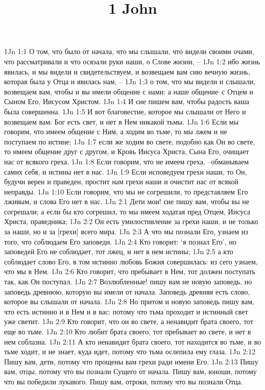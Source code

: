

\title{1 John}

1Jn 1:1  О том, что было от начала, что мы слышали, что видели своими очами, что рассматривали и что осязали руки наши, о Слове жизни, --
1Jn 1:2  ибо жизнь явилась, и мы видели и свидетельствуем, и возвещаем вам сию вечную жизнь, которая была у Отца и явилась нам, --
1Jn 1:3  о том, что мы видели и слышали, возвещаем вам, чтобы и вы имели общение с нами: а наше общение--с Отцем и Сыном Его, Иисусом Христом.
1Jn 1:4  И сие пишем вам, чтобы радость ваша была совершенна.
1Jn 1:5  И вот благовестие, которое мы слышали от Него и возвещаем вам: Бог есть свет, и нет в Нем никакой тьмы.
1Jn 1:6  Если мы говорим, что имеем общение с Ним, а ходим во тьме, то мы лжем и не поступаем по истине;
1Jn 1:7  если же ходим во свете, подобно как Он во свете, то имеем общение друг с другом, и Кровь Иисуса Христа, Сына Его, очищает нас от всякого греха.
1Jn 1:8  Если говорим, что не имеем греха, --обманываем самих себя, и истины нет в нас.
1Jn 1:9  Если исповедуем грехи наши, то Он, будучи верен и праведен, простит нам грехи наши и очистит нас от всякой неправды.
1Jn 1:10  Если говорим, что мы не согрешили, то представляем Его лживым, и слова Его нет в нас.
1Jn 2:1  Дети мои! сие пишу вам, чтобы вы не согрешали; а если бы кто согрешил, то мы имеем ходатая пред Отцем, Иисуса Христа, праведника;
1Jn 2:2  Он есть умилостивление за грехи наши, и не только за наши, но и за [грехи] всего мира.
1Jn 2:3  А что мы познали Его, узнаем из того, что соблюдаем Его заповеди.
1Jn 2:4  Кто говорит: `я познал Его', но заповедей Его не соблюдает, тот лжец, и нет в нем истины;
1Jn 2:5  а кто соблюдает слово Его, в том истинно любовь Божия совершилась: из сего узнаем, что мы в Нем.
1Jn 2:6  Кто говорит, что пребывает в Нем, тот должен поступать так, как Он поступал.
1Jn 2:7  Возлюбленные! пишу вам не новую заповедь, но заповедь древнюю, которую вы имели от начала. Заповедь древняя есть слово, которое вы слышали от начала.
1Jn 2:8  Но притом и новую заповедь пишу вам, что есть истинно и в Нем и в вас: потому что тьма проходит и истинный свет уже светит.
1Jn 2:9  Кто говорит, что он во свете, а ненавидит брата своего, тот еще во тьме.
1Jn 2:10  Кто любит брата своего, тот пребывает во свете, и нет в нем соблазна.
1Jn 2:11  А кто ненавидит брата своего, тот находится во тьме, и во тьме ходит, и не знает, куда идет, потому что тьма ослепила ему глаза.
1Jn 2:12  Пишу вам, дети, потому что прощены вам грехи ради имени Его.
1Jn 2:13  Пишу вам, отцы, потому что вы познали Сущего от начала. Пишу вам, юноши, потому что вы победили лукавого. Пишу вам, отроки, потому что вы познали Отца.
